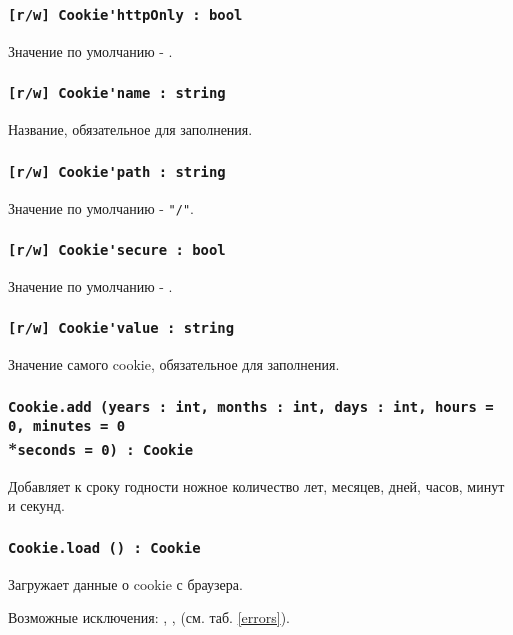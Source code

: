 \subsubsection{\lstinline|[r/w] Cookie'httpOnly : bool|}

Значение по умолчанию - \false.

\subsubsection{\lstinline|[r/w] Cookie'name : string|}

Название, обязательное для заполнения.

\subsubsection{\lstinline|[r/w] Cookie'path : string|}

Значение по умолчанию - \lstinline|"/"|.

\subsubsection{\lstinline|[r/w] Cookie'secure : bool|}

Значение по умолчанию - \false.

\subsubsection{\lstinline|[r/w] Cookie'value : string|}

Значение самого cookie, обязательное для заполнения.

\subsubsection{\lstinline|Cookie.add (years : int, months : int, days : int, hours = 0, minutes = 0|\\*\noindent\lstinline|seconds = 0) : Cookie|}

Добавляет к сроку годности ножное количество лет, месяцев, дней, часов, минут и секунд.

\subsubsection{\lstinline|Cookie.load () : Cookie|}

Загружает данные о cookie с браузера.

Возможные исключения: , ,  (см. таб. \ref{errors}).


